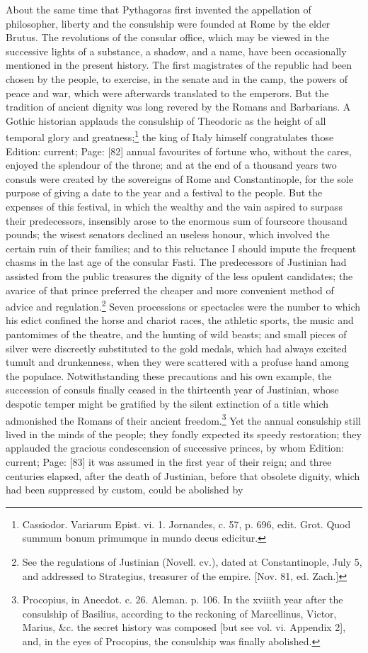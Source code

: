 About the same time that Pythagoras first invented the appellation of philosopher, liberty and the consulship were founded at Rome by the elder Brutus. The revolutions of the consular office, which may be viewed in the successive lights of a substance, a shadow, and a name, have been occasionally mentioned in the present history. The first magistrates of the republic had been chosen by the people, to exercise, in the senate and in the camp, the powers of peace and war, which were afterwards translated to the emperors. But the tradition of ancient dignity was long revered by the Romans and Barbarians. A Gothic historian applauds the consulship of Theodoric as the height of all temporal glory and greatness;\footnote{Cassiodor. Variarum Epist. vi. 1. Jornandes, c. 57, p. 696, edit. Grot. Quod summum bonum primumque in mundo decus edicitur.} the king of Italy himself congratulates those Edition: current; Page: [82] annual favourites of fortune who, without the cares, enjoyed the splendour of the throne; and at the end of a thousand years two consuls were created by the sovereigns of Rome and Constantinople, for the sole purpose of giving a date to the year and a festival to the people. But the expenses of this festival, in which the wealthy and the vain aspired to surpass their predecessors, insensibly arose to the enormous sum of fourscore thousand pounds; the wisest senators declined an useless honour, which involved the certain ruin of their families; and to this reluctance I should impute the frequent chasms in the last age of the consular Fasti. The predecessors of Justinian had assisted from the public treasures the dignity of the less opulent candidates; the avarice of that prince preferred the cheaper and more convenient method of advice and regulation.\footnote{See the regulations of Justinian (Novell. cv.), dated at Constantinople, July 5, and addressed to Strategius, treasurer of the empire. [Nov. 81, ed. Zach.]} Seven processions or spectacles were the number to which his edict confined the horse and chariot races, the athletic sports, the music and pantomimes of the theatre, and the hunting of wild beasts; and small pieces of silver were discreetly substituted to the gold medals, which had always excited tumult and drunkenness, when they were scattered with a profuse hand among the populace. Notwithstanding these precautions and his own example, the succession of consuls finally ceased in the thirteenth year of Justinian, whose despotic temper might be gratified by the silent extinction of a title which admonished the Romans of their ancient freedom.\footnote{Procopius, in Anecdot. c. 26. Aleman. p. 106. In the xviiith year after the consulship of Basilius, according to the reckoning of Marcellinus, Victor, Marius, \&c. the secret history was composed [but see vol. vi. Appendix 2], and, in the eyes of Procopius, the consulship was finally abolished.} Yet the annual consulship still lived in the minds of the people; they fondly expected its speedy restoration; they applauded the gracious condescension of successive princes, by whom Edition: current; Page: [83] it was assumed in the first year of their reign; and three centuries elapsed, after the death of Justinian, before that obsolete dignity, which had been suppressed by custom, could be abolished by 